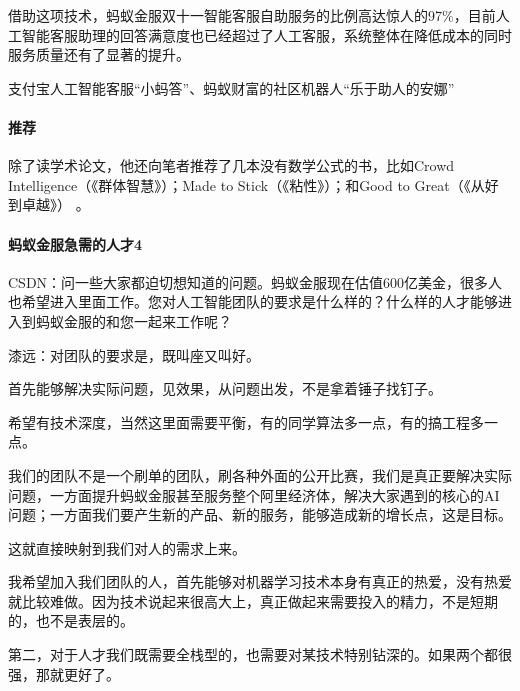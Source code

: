 \documentclass[letterpaper,11pt,english]{sphinxmanual}
\begin{document}
借助这项技术，蚂蚁金服双十一智能客服自助服务的比例高达惊人的97\%，目前人工智能客服助理的回答满意度也已经超过了人工客服，系统整体在降低成本的同时服务质量还有了显著的提升。

支付宝人工智能客服“小蚂答”、蚂蚁财富的社区机器人“乐于助人的安娜”%
\begin{footnote}[306]\sphinxAtStartFootnote
{}
%
\end{footnote}


\paragraph{推荐}
\label{\detokenize{chapter_dive/qi_yuan:id7}}
除了读学术论文，他还向笔者推荐了几本没有数学公式的书，比如Crowd
Intelligence（《群体智慧》）；Made to Stick（《粘性》）；和Good to
Great（《从好到卓越》） 。


\paragraph{蚂蚁金服急需的人才4\sphinxfootnotemark[307]}
\label{\detokenize{chapter_dive/qi_yuan:id8}}%
\begin{footnotetext}[307]\sphinxAtStartFootnote
{}
%
\end{footnotetext}\ignorespaces 
CSDN：问一些大家都迫切想知道的问题。蚂蚁金服现在估值600亿美金，很多人也希望进入里面工作。您对人工智能团队的要求是什么样的？什么样的人才能够进入到蚂蚁金服的和您一起来工作呢？

漆远：对团队的要求是，既叫座又叫好。

首先能够解决实际问题，见效果，从问题出发，不是拿着锤子找钉子。

希望有技术深度，当然这里面需要平衡，有的同学算法多一点，有的搞工程多一点。

我们的团队不是一个刷单的团队，刷各种外面的公开比赛，我们是真正要解决实际问题，一方面提升蚂蚁金服甚至服务整个阿里经济体，解决大家遇到的核心的AI问题；一方面我们要产生新的产品、新的服务，能够造成新的增长点，这是目标。

这就直接映射到我们对人的需求上来。

我希望加入我们团队的人，首先能够对机器学习技术本身有真正的热爱，没有热爱就比较难做。因为技术说起来很高大上，真正做起来需要投入的精力，不是短期的，也不是表层的。

第二，对于人才我们既需要全栈型的，也需要对某技术特别钻深的。如果两个都很强，那就更好了。
\end{document}
